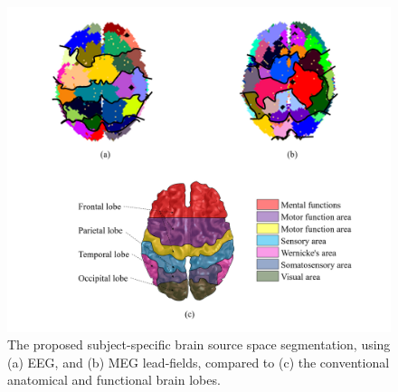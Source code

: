 \begin{figure}[!b]
\centering
\includegraphics[width=1\textwidth,keepaspectratio]{images/Atlas.png} %
\centering
\caption{The proposed subject-specific brain source space segmentation, using (a) EEG, and (b) MEG lead-fields, compared to (c) the conventional anatomical and functional brain lobes.}
\label{fig:Atlas}
\end{figure}